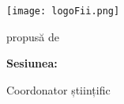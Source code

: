 \begin{titlepage}
    \begin{center}
        \large
        \MakeUppercase{\university}
        
        \LARGE
        \textbf{\MakeUppercase{\faculty}}
        
        \vspace{1cm}
        \texttt{[image: logoFii.png]}
        
        \vspace{1cm}
        \Large
        \MakeUppercase{\thesistype}
        
        \vspace{0.5cm}
        \LARGE
        \textbf{\thesistitle}
        
        \vspace{2cm}
        \Large
        propusă de
        
        \vspace{0.5cm}
        \LARGE
        \textbf{\authornamefl}
        
        \vfill
        \Large
        \textbf{Sesiunea:} \session
        
        \vspace{2cm}
        \Large
        Coordonator științific
        
        \vspace{0.5cm}
        \LARGE
        \textbf{\coordinator}
    \end{center}
\end{titlepage}